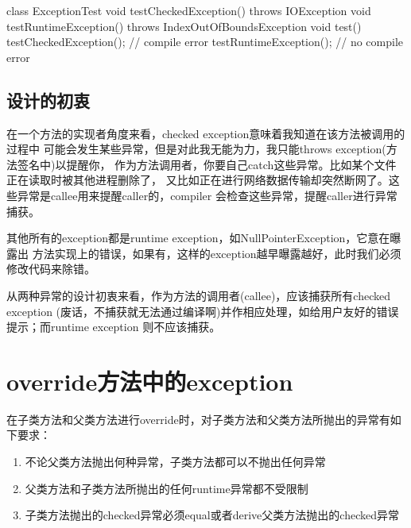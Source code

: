 \begin{javacode}
class ExceptionTest {
  void testCheckedException() throws IOException { }
  void testRuntimeException() throws IndexOutOfBoundsException { }
  void test() {
    testCheckedException(); // compile error
    testRuntimeException(); // no compile error
  }
}
\end{javacode}

\subsection[设计的初衷]{设计的初衷}
在一个方法的实现者角度来看，checked exception意味着我知道在该方法被调用的过程中
可能会发生某些异常，但是对此我无能为力，我只能throws exception(方法签名中)以提醒你，
作为方法调用者，你要自己catch这些异常。比如某个文件正在读取时被其他进程删除了，
又比如正在进行网络数据传输却突然断网了。这些异常是callee用来提醒caller的，compiler
会检查这些异常，提醒caller进行异常捕获。

其他所有的exception都是runtime exception，如NullPointerException，它意在曝露出
方法实现上的错误，如果有，这样的exception越早曝露越好，此时我们必须修改代码来除错。

从两种异常的设计初衷来看，作为方法的调用者(callee)，应该捕获所有checked exception
(废话，不捕获就无法通过编译啊)并作相应处理，如给用户友好的错误提示；而runtime exception
则不应该捕获。

\section[override方法中的exception]{override方法中的exception}
\label{sec:exceptions-in-override}
在子类方法和父类方法进行override时，对子类方法和父类方法所抛出的异常有如下要求：

\begin{enumerate}
  \item 不论父类方法抛出何种异常，子类方法都可以不抛出任何异常
  \item 父类方法和子类方法所抛出的任何runtime异常都不受限制
  \item 子类方法抛出的checked异常必须equal或者derive父类方法抛出的checked异常
\end{enumerate}

